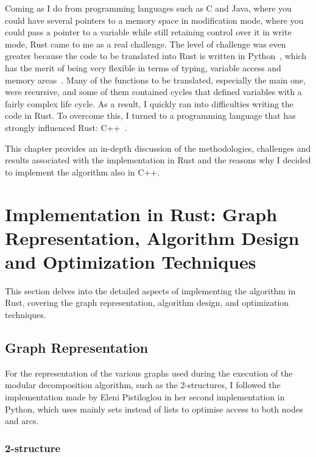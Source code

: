 Coming as I do from programming languages such as C and Java, where you could have several pointers to a memory space in modification mode, where you could pass a pointer to a variable while still retaining control over it in write mode, Rust came to me as a real challenge.
The level of challenge was even greater because the code to be translated into Rust is written in Python~\cite{pythoncode}, which has the merit of being very flexible in terms of typing, variable access and memory areas~\cite{python}.
Many of the functions to be translated, especially the main one, were recursive, and some of them contained cycles that defined variables with a fairly complex life cycle.
As a result, I quickly ran into difficulties writing the code in Rust.
To overcome this, I turned to a programming language that has strongly influenced Rust: C++~\cite{cpp}.

This chapter provides an in-depth discussion of the methodologies, challenges and results associated with the implementation in Rust and the reasons why I decided to implement the algorithm also in C++.


\section{Implementation in Rust: Graph Representation, Algorithm Design and Optimization Techniques}\label{sec:implementation-in-rust:-graph-representation-algorithm-design-and-optimization-techniques}

This section delves into the detailed aspects of implementing the algorithm in Rust, covering the graph representation, algorithm design, and optimization techniques.

\subsection{Graph Representation}\label{subsec:graph-representation}

For the representation of the various graphs used during the execution of the modular decomposition algorithm, such as the 2-structures, I followed the implementation made by Eleni Pistiloglou in her second implementation in Python, which uses mainly sets instead of lists to optimise access to both nodes and arcs.

\subsubsection{2-structure}

